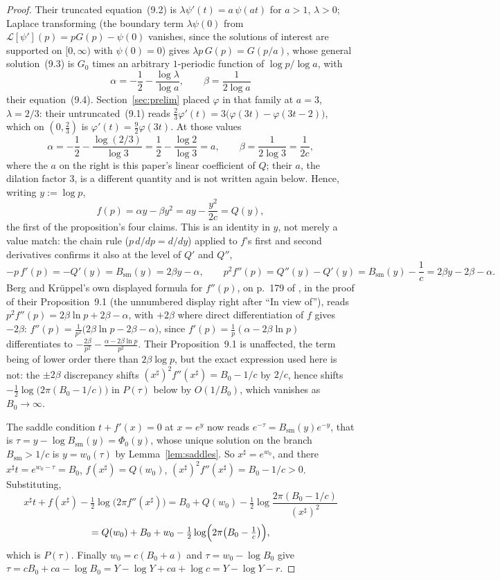 \documentclass[11pt]{article}
\theoremstyle{definition}
\theoremstyle{remark}
\begin{document}
\begin{proof}
Their truncated equation~(9.2) is $\lambda \psi'(t) = a\,\psi(at)$ for $a>1$, $\lambda>0$; Laplace
transforming (the boundary term $\lambda\psi(0)$ from $\mathcal L[\psi'](p)=pG(p)-\psi(0)$ vanishes,
since the solutions of interest are supported on $[0,\infty)$ with $\psi(0)=0$) gives $\lambda
p\,G(p) = G(p/a)$, whose general solution~(9.3) is $G_0$ times an arbitrary $1$-periodic function
of $\log p/\log a$, with
\[
\alpha = -\frac12-\frac{\log\lambda}{\log a}, \qquad \beta = \frac{1}{2\log a}
\]
their equation~(9.4). Section~\ref{sec:prelim} placed $\varphi$ in that family at $a=3$,
$\lambda=2/3$: their untruncated~(9.1) reads $\tfrac23\varphi'(t) = 3\bigl(\varphi(3t) -
\varphi(3t-2)\bigr)$, which on $(0,\tfrac23)$ is $\varphi'(t) = \tfrac92\varphi(3t)$. At those
values
\[
\alpha = -\frac12-\frac{\log(2/3)}{\log3} = \frac12-\frac{\log2}{\log3} = a, \qquad
\beta = \frac{1}{2\log3} = \frac{1}{2c},
\]
where the $a$ on the right is this paper's linear coefficient of $Q$; their $a$, the dilation
factor $3$, is a different quantity and is not written again below. Hence, writing $y := \log p$,
\[
f(p) = \alpha y-\beta y^2 = a y - \frac{y^2}{2c} = Q(y),
\]
the first of the proposition's four claims. This is an identity in $y$, not merely a value match:
the chain rule ($p\,d/dp = d/dy$) applied to $f$'s first and second derivatives confirms it also at
the level of $Q'$ and $Q''$,
\[
-p\,f'(p) = -Q'(y) = B_{\mathrm{sm}}(y) = 2\beta y-\alpha, \qquad
p^2f''(p) = Q''(y)-Q'(y) = B_{\mathrm{sm}}(y)-\frac1c = 2\beta y-2\beta-\alpha .
\]
Berg and Kr\"uppel's own displayed formula for $f''(p)$, on p.~179 of \cite{BergKruppel1998}, in
the proof of their Proposition~9.1 (the unnumbered display right after ``In view of''), reads
$p^2f''(p)=2\beta\ln p+2\beta-\alpha$,
with $+2\beta$ where direct differentiation of $f$ gives $-2\beta$: $f''(p) =
\tfrac{1}{p^2}\bigl(2\beta\ln p - 2\beta - \alpha\bigr)$, since $f'(p)=\tfrac1p(\alpha-2\beta\ln p)$
differentiates to $-\tfrac{2\beta}{p^2}-\tfrac{\alpha-2\beta\ln p}{p^2}$. Their Proposition~9.1 is
unaffected, the term being of lower order there than $2\beta\log p$, but the exact expression used
here is not: the $\pm2\beta$ discrepancy shifts $(x^\sharp)^2f''(x^\sharp) = B_0-1/c$ by $2/c$, hence
shifts $-\tfrac12\log\bigl(2\pi(B_0-1/c)\bigr)$ in $P(\tau)$ below by $O(1/B_0)$, which vanishes as
$B_0\to\infty$.

The saddle condition $t+f'(x)=0$ at $x=e^y$ now reads $e^{-\tau} = B_{\mathrm{sm}}(y)e^{-y}$, that
is $\tau = y-\log B_{\mathrm{sm}}(y) = \Phi_0(y)$, whose unique solution on the branch
$B_{\mathrm{sm}}>1/c$ is $y = w_0(\tau)$ by Lemma~\ref{lem:saddles}. So $x^\sharp = e^{w_0}$, and
there $x^\sharp t = e^{w_0-\tau} = B_0$, $f(x^\sharp) = Q(w_0)$, $(x^\sharp)^2f''(x^\sharp) = B_0 -
1/c>0$. Substituting,
\[
x^\sharp t+f(x^\sharp)-\tfrac12\log\bigl(2\pi f''(x^\sharp)\bigr)
= B_0+Q(w_0)-\tfrac12\log\frac{2\pi(B_0-1/c)}{(x^\sharp)^2}
\]
\[
= Q(w_0)+B_0+w_0-\tfrac12\log\Bigl(2\pi\bigl(B_0-\tfrac1c\bigr)\Bigr),
\]
which is $P(\tau)$. Finally $w_0 = c(B_0+a)$ and $\tau = w_0-\log B_0$ give $\tau = cB_0+ca-\log
B_0 = Y-\log Y+ca+\log c = Y-\log Y-r$.
\end{proof}
\end{document}
